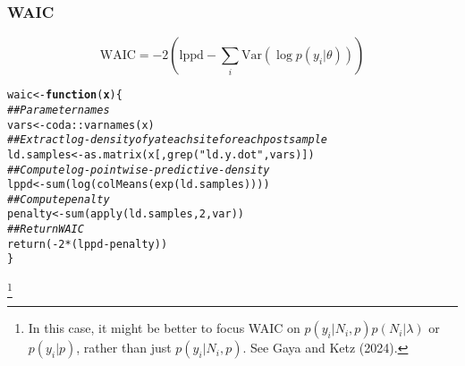 \documentclass[color=usenames,dvipsnames]{beamer}\usepackage[]{graphicx}\usepackage[]{xcolor}
\makeatletter
\newcommand{\hlnum}[1]{\textcolor[rgb]{0.69,0.494,0}{#1}}%
\newcommand{\hlsng}[1]{\textcolor[rgb]{0.749,0.012,0.012}{#1}}%
\newcommand{\hlcom}[1]{\textcolor[rgb]{0.514,0.506,0.514}{\textit{#1}}}%
\newcommand{\hlopt}[1]{\textcolor[rgb]{0,0,0}{#1}}%
\newcommand{\hldef}[1]{\textcolor[rgb]{0,0,0}{#1}}%
\newcommand{\hlkwa}[1]{\textcolor[rgb]{0,0,0}{\textbf{#1}}}%
\newcommand{\hlkwb}[1]{\textcolor[rgb]{0,0.341,0.682}{#1}}%
\newcommand{\hlkwc}[1]{\textcolor[rgb]{0,0,0}{\textbf{#1}}}%
\newcommand{\hlkwd}[1]{\textcolor[rgb]{0.004,0.004,0.506}{#1}}%
\newenvironment{kframe}{%
 \def\at@end@of@kframe{}%
 \ifinner\ifhmode%
  \def\at@end@of@kframe{\end{minipage}}%
  \begin{minipage}{\columnwidth}%
 \fi\fi%
 \def\FrameCommand##1{\hskip\@totalleftmargin \hskip-\fboxsep
 \colorbox{shadecolor}{##1}\hskip-\fboxsep
     \hskip-\linewidth \hskip-\@totalleftmargin \hskip\columnwidth}%
 \MakeFramed {\advance\hsize-\width
   \@totalleftmargin\z@ \linewidth\hsize
   \@setminipage}}%
 {\par\unskip\endMakeFramed%
 \at@end@of@kframe}
\newenvironment{knitrout}{}{} %
\makeatother
\begin{document}
\bgroup
\let\oldfootnoterule\footnoterule
\def\footnoterule{\only<2->\oldfootnoterule}
\begin{frame}[fragile]
  \frametitle{WAIC}
  \[
    \mathrm{WAIC} = -2\left(\mathrm{lppd} - \sum_i \mathrm{Var}(\log p(y_i|\theta))\right)
  \]

\begin{knitrout}\footnotesize
{}\color{fgcolor}\begin{kframe}
\begin{alltt}
\hldef{waic} \hlkwb{<-} \hlkwa{function}\hldef{(}\hlkwc{x}\hldef{) \{}
    \hlcom{## Parameter names}
    \hldef{vars} \hlkwb{<-} \hldef{coda}\hlopt{::}\hlkwd{varnames}\hldef{(x)}
    \hlcom{## Extract log-density of y at each site for each post sample}
    \hldef{ld.samples} \hlkwb{<-} \hlkwd{as.matrix}\hldef{(x[,}\hlkwd{grep}\hldef{(}\hlsng{"ld.y.dot"}\hldef{, vars)])}
    \hlcom{## Compute log-pointwise-predictive-density}
    \hldef{lppd} \hlkwb{<-} \hlkwd{sum}\hldef{(}\hlkwd{log}\hldef{(}\hlkwd{colMeans}\hldef{(}\hlkwd{exp}\hldef{(ld.samples))))}
    \hlcom{## Compute penalty}
    \hldef{penalty} \hlkwb{<-} \hlkwd{sum}\hldef{(}\hlkwd{apply}\hldef{(ld.samples,} \hlnum{2}\hldef{, var))}
    \hlcom{## Return WAIC}
    \hlkwd{return}\hldef{(}\hlopt{-}\hlnum{2}\hlopt{*}\hldef{(lppd}\hlopt{-}\hldef{penalty))}
\hldef{\}}
\end{alltt}
\end{kframe}
\end{knitrout}
\let\thefootnote\relax\footnote<2->{In this case, it might be better to focus WAIC on
$p(y_i|N_i,p)p(N_i|\lambda)$ or $p(y_i|p)$, rather than just
  $p(y_i|N_i,p)$. See Gaya and Ketz (2024).} 
\end{frame}
\egroup


\end{document}
